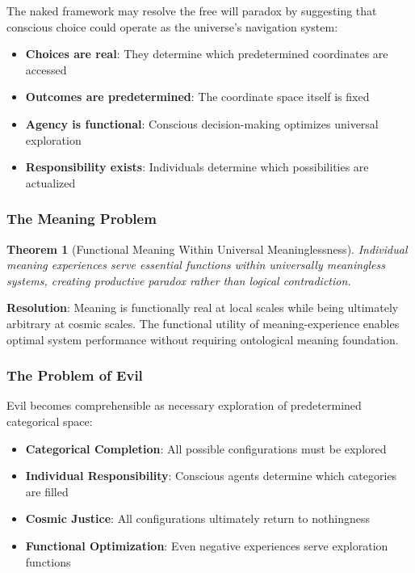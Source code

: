 \documentclass[11pt,a4paper]{article}
\newtheorem{theorem}{Theorem}[section]
\theoremstyle{remark}
\begin{document}
The naked framework may resolve the free will paradox by suggesting that conscious choice could operate as the universe's navigation system:

\begin{itemize}
\item \textbf{Choices are real}: They determine which predetermined coordinates are accessed
\item \textbf{Outcomes are predetermined}: The coordinate space itself is fixed
\item \textbf{Agency is functional}: Conscious decision-making optimizes universal exploration
\item \textbf{Responsibility exists}: Individuals determine which possibilities are actualized
\end{itemize}

\subsubsection{The Meaning Problem}

\begin{theorem}[Functional Meaning Within Universal Meaninglessness]
Individual meaning experiences serve essential functions within universally meaningless systems, creating productive paradox rather than logical contradiction.
\end{theorem}

\textbf{Resolution}: Meaning is functionally real at local scales while being ultimately arbitrary at cosmic scales. The functional utility of meaning-experience enables optimal system performance without requiring ontological meaning foundation.

\subsubsection{The Problem of Evil}

Evil becomes comprehensible as necessary exploration of predetermined categorical space:

\begin{itemize}
\item \textbf{Categorical Completion}: All possible configurations must be explored
\item \textbf{Individual Responsibility}: Conscious agents determine which categories are filled
\item \textbf{Cosmic Justice}: All configurations ultimately return to nothingness
\item \textbf{Functional Optimization}: Even negative experiences serve exploration functions
\end{itemize}
\end{document}
